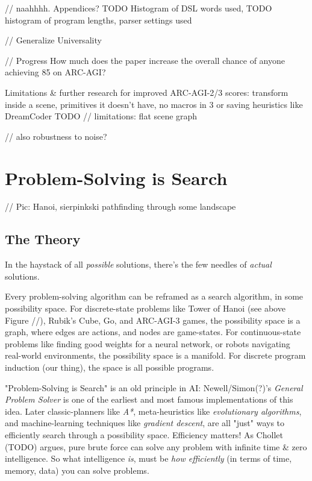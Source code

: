 \documentclass{article}
\begin{document}
// naahhhh. Appendices? TODO Histogram of DSL words used, TODO histogram of program lengths, parser settings used

// Generalize Universality

// Progress How much does the paper increase the overall chance of anyone achieving 85 on ARC-AGI?

Limitations \& further research for improved ARC-AGI-2/3 scores: transform inside a scene, primitives it doesn’t have, no macros in 3 or saving heuristics like DreamCoder TODO //  limitations: flat scene graph

// also robustness to noise?

\section{Problem-Solving is Search}

// Pic: Hanoi, sierpinkski pathfinding through some landscape

\subsection{The Theory}

In the haystack of all \textit{possible} solutions, there's the few needles of \textit{actual} solutions.

Every problem-solving algorithm can be reframed as a search algorithm, in some possibility space. For discrete-state problems like Tower of Hanoi (see above Figure //), Rubik's Cube, Go, and ARC-AGI-3 games, the possibility space is a graph, where edges are actions, and nodes are game-states. For continuous-state problems like finding good weights for a neural network, or robots navigating real-world environments, the possibility space is a manifold. For discrete program induction (our thing), the space is all possible programs.

"Problem-Solving is Search" is an old principle in AI: Newell/Simon(?)'s \textit{General Problem Solver} is one of the earliest and most famous implementations of this idea. Later classic-planners like \textit{A*}, meta-heuristics like \textit{evolutionary algorithms}, and machine-learning techniques like \textit{gradient descent}, are all "just" ways to efficiently search through a possibility space. Efficiency matters! As Chollet (TODO) argues, pure brute force can solve any problem with infinite time \& zero intelligence. So what intelligence \textit{is}, must be \textit{how efficiently} (in terms of time, memory, data) you can solve problems.
\end{document}

